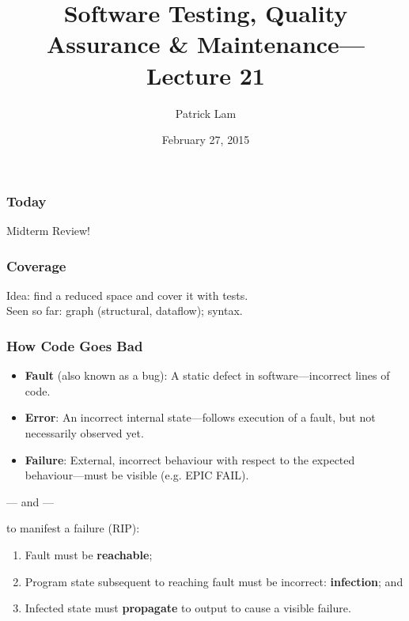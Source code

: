 \documentclass{beamer}
\title{Software Testing, Quality Assurance \& Maintenance---Lecture 21}
\author{Patrick Lam}
\date{February 27, 2015}
\newenvironment{changemargin}[1]{%
  \begin{list}{}{%
    \setlength{\topsep}{0pt}%
    \setlength{\leftmargin}{#1}%
    \setlength{\rightmargin}{1em}
    \setlength{\listparindent}{\parindent}%
    \setlength{\itemindent}{\parindent}%
    \setlength{\parsep}{\parskip}%
  }%
  \item[]}{\end{list}}
\begin{document}
\begin{frame}
  \titlepage
\end{frame}

\begin{frame}
\frametitle{Today}
\begin{changemargin}{2cm}
Midterm Review!
\end{changemargin}
\end{frame}

\begin{frame}
  \frametitle{Coverage}

\large
  \begin{changemargin}{2em}
Idea: find a reduced space and cover it with tests.\\[1em]

Seen so far: graph (structural, dataflow); syntax.
  \end{changemargin}
  
\end{frame}

\begin{frame}
  \frametitle{How Code Goes Bad}
  \begin{changemargin}{1cm}
\begin{itemize}
\item {\bf Fault} (also known as a bug): A static defect in software---incorrect lines of code.
\item {\bf Error}: An incorrect internal state---follows execution of a fault, but not necessarily observed yet.
\item {\bf Failure}: External, incorrect behaviour with respect to the expected behaviour---must be visible (e.g. EPIC FAIL).
\end{itemize}

\begin{center} --- and  --- 
\end{center}

to manifest a failure (RIP):
\begin{enumerate}
\item Fault must be {\bf reachable};
\item Program state subsequent to reaching fault must be incorrect: {\bf infection}; and
\item Infected state must {\bf propagate} to output to cause a visible failure.
\end{enumerate}
  \end{changemargin}
  
\end{frame}
\end{document}
